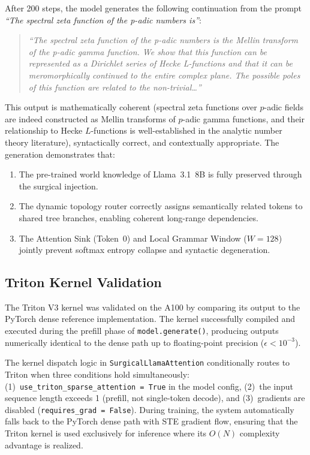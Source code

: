 \documentclass[11pt,a4paper]{article}
\begin{document}
After 200 steps, the model generates the following continuation from the prompt \emph{``The spectral zeta function of the p-adic numbers is''}:

\begin{quote}
\emph{``The spectral zeta function of the p-adic numbers is the Mellin transform of the p-adic gamma function. We show that this function can be represented as a Dirichlet series of Hecke L-functions and that it can be meromorphically continued to the entire complex plane. The possible poles of this function are related to the non-trivial\ldots''}
\end{quote}

This output is mathematically coherent (spectral zeta functions over $p$-adic fields are indeed constructed as Mellin transforms of $p$-adic gamma functions, and their relationship to Hecke $L$-functions is well-established in the analytic number theory literature), syntactically correct, and contextually appropriate. The generation demonstrates that:

\begin{enumerate}
    \item The pre-trained world knowledge of Llama~3.1~8B is fully preserved through the surgical injection.
    \item The dynamic topology router correctly assigns semantically related tokens to shared tree branches, enabling coherent long-range dependencies.
    \item The Attention Sink (Token~0) and Local Grammar Window ($W = 128$) jointly prevent softmax entropy collapse and syntactic degeneration.
\end{enumerate}

\subsection{Triton Kernel Validation}

The Triton V3 kernel was validated on the A100 by comparing its output to the PyTorch dense reference implementation. The kernel successfully compiled and executed during the prefill phase of \texttt{model.generate()}, producing outputs numerically identical to the dense path up to floating-point precision ($\epsilon < 10^{-3}$).

The kernel dispatch logic in \texttt{SurgicalLlamaAttention} conditionally routes to Triton when three conditions hold simultaneously: (1)~\texttt{use\_triton\_sparse\_attention = True} in the model config, (2)~the input sequence length exceeds 1 (prefill, not single-token decode), and (3)~gradients are disabled (\texttt{requires\_grad = False}). During training, the system automatically falls back to the PyTorch dense path with STE gradient flow, ensuring that the Triton kernel is used exclusively for inference where its $O(N)$ complexity advantage is realized.
\end{document}
